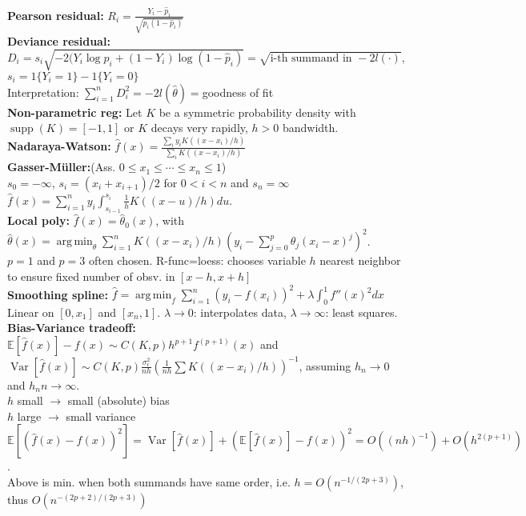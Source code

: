 \documentclass[11pt]{article}
\newcommand{\E}{\mathbb{E}}
\DeclareMathOperator*{\argmin}{arg\,min}
\DeclareMathOperator*{\supp}{supp}
\DeclareMathOperator*{\V}{Var}
\begin{document}
\begin{multicols}{4}
\textbf{Pearson residual:} $R_i=\frac{Y_i-\hat{p}_i}{\sqrt{\hat{p}_i(1-\hat{p}_i)}}$\\
\textbf{Deviance residual:} $D_i=s_i\sqrt{-2(Y_i\log\hat{p}_i+(1-Y_i)\log(1-\hat{p}_i)}=\sqrt{\textrm{i-th summand in } -2l(\cdot)}$, $s_i=1\{Y_i=1\}-1\{Y_i=0\}$\\
Interpretation: $\sum_{i=1}^nD_i^2=-2l(\hat{\theta})=$goodness of fit\\
\textbf{Non-parametric reg:} Let $K$ be a symmetric probability density with $\supp(K)=[-1,1]$ or $K$ decays very rapidly, $h>0$ bandwidth.\\
\textbf{Nadaraya-Watson:} $\hat{f}(x)=\frac{\sum_iy_iK((x-x_i)/h)}{\sum_i K((x-x_i)/h)}$\\
\textbf{Gasser-Müller:}(Ass. $0\leq x_1\leq \cdots \leq x_n\leq 1$)\\
$s_0=-\infty$, $s_i=(x_i+x_{i+1})/2$ for $0<i<n$ and $s_n=\infty$\\
$\hat{f}(x)=\sum^n_{i=1}y_i\int^{s_i}_{s_{i-1}}\frac{1}{h}K((x-u)/h)du$.\\
\textbf{Local poly:} $\hat{f}(x)=\hat{\theta}_0(x)$, with $\hat{\theta}(x)=\argmin_\theta\sum^n_{i=1}K((x-x_i)/h)(y_i-\sum^p_{j=0}\theta_j(x_i-x)^j)^2$.\\
$p=1$ and $p=3$ often chosen. R-func=loess: chooses variable $h$ nearest neighbor to ensure fixed number of obsv. in $[x-h,x+h]$\\

\textbf{Smoothing spline:} $\hat{f}=\argmin_f \sum^n_{i=1}(y_i-f(x_i))^2+\lambda\int^1_0 f''(x)^2dx$\\
Linear on $[0,x_1]$ and $[x_n,1]$. $\lambda\rightarrow 0$: interpolates data, $\lambda\rightarrow \infty$: least squares.\\
\textbf{Bias-Variance tradeoff:}\\
$\E[\hat{f}(x)]-f(x)\sim C(K,p)h^{p+1}f^{(p+1)}(x)$ and $\V[\hat{f}(x)]\sim C(K,p)\frac{\sigma_\epsilon^2}{nh}(\frac{1}{nh}\sum K((x-x_i)/h))^{-1}$, assuming $h_n\rightarrow 0$ and $h_nn\rightarrow \infty$.\\
$h$ small $\rightarrow$ small (absolute) bias\\
$h$ large $\rightarrow$ small variance\\
$\E[(\hat{f}(x)-f(x))^2]=\V[\hat{f}(x)]+(\E[\hat{f}(x)]-f(x))^2=O((nh)^{-1})+O(h^{2(p+1)})$.\\
Above is min. when both summands have same order, i.e. $h=O(n^{-1/(2p+3)})$, thus $O(n^{-(2p+2)/(2p+3)})$\\


\end{multicols}
\end{document}
